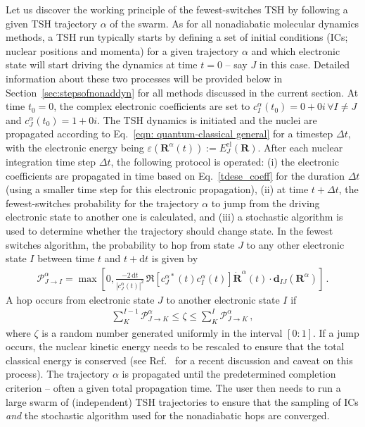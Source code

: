 \documentclass[9pt,bestpractices,pubversion]{livecoms}
\newcommand{\bs}{\mathbf}
\begin{document}
Let us discover the working principle of the fewest-switches TSH by following a given TSH trajectory $\alpha$ of the swarm. As for all nonadiabatic molecular dynamics methods, a TSH run typically starts by defining a set of initial conditions (ICs; nuclear positions and momenta) for a given trajectory $\alpha$ and which electronic state will start driving the dynamics at time $t=0$ -- say $J$ in this case. Detailed information about these two processes will be provided below in Section~\ref{sec:stepsofnonaddyn} for all methods discussed in the current section. At time $t_0=0$, the complex electronic coefficients are set to $c_I^{\alpha}(t_0)=0+0i\, \forall I\neq J$ and $c_J^{\alpha}(t_0)=1+0i$. The TSH dynamics is initiated and the nuclei are propagated according to Eq.~\eqref{eqn: quantum-classical general} for a timestep $\Delta t$, with the electronic energy being $\varepsilon(\bs R^{\alpha}(t)) := E_J^{\text{el}}(\bs R)$. After each nuclear integration time step $\Delta t$, the following protocol is operated: (i) the electronic coefficients are propagated in time based on Eq.~\eqref{tdese_coeff} for the duration $\Delta t$ (using a smaller time step for this electronic propagation), (ii) at time $t+\Delta t$, the fewest-switches probability for the trajectory $\alpha$ to jump from the driving electronic state to another one is calculated, and (iii) a stochastic algorithm is used to determine whether the trajectory should change state. In the fewest switches algorithm,\cite{tully90} the probability to hop from state $J$ to any other electronic state $I$ between time $t$ and $t+\text{d}t$ is given by
\begin{align}
\mathcal P_{J\rightarrow I}^{\alpha} = \max\left[0, \frac{-2 \,\mathrm{d}t}{\left|c_J^{\alpha}(t)\right|^2} \,\Re\left[c_J^{\alpha \ast}(t)c_I^{\alpha}(t)\right] \dot{\bs R}^{\alpha}(t)\cdot \bs d_{IJ}\left(\bs R^{\alpha}\right)\right] \, .
\label{eq:tshproba}
\end{align}
A hop occurs from electronic state $J$ to another electronic state $I$ if
\begin{align}
\sum_K^{I-1} \mathcal P_{J\rightarrow K}^{\alpha} \le \zeta \le \sum_K^{I} \mathcal P_{J\rightarrow K}^{\alpha} \, ,
\end{align}
where $\zeta$ is a random number generated uniformly in the interval $[0:1]$. If a jump occurs, the nuclear kinetic energy needs to be rescaled to ensure that the total classical energy is conserved (see Ref.~ for a recent discussion and caveat on this process). The trajectory $\alpha$ is propagated until the predetermined completion criterion -- often a given total propagation time. The user then needs to run a large swarm of (independent) TSH trajectories to ensure that the sampling of ICs \textit{and} the stochastic algorithm used for the nonadiabatic hops are converged.  
\end{document}
